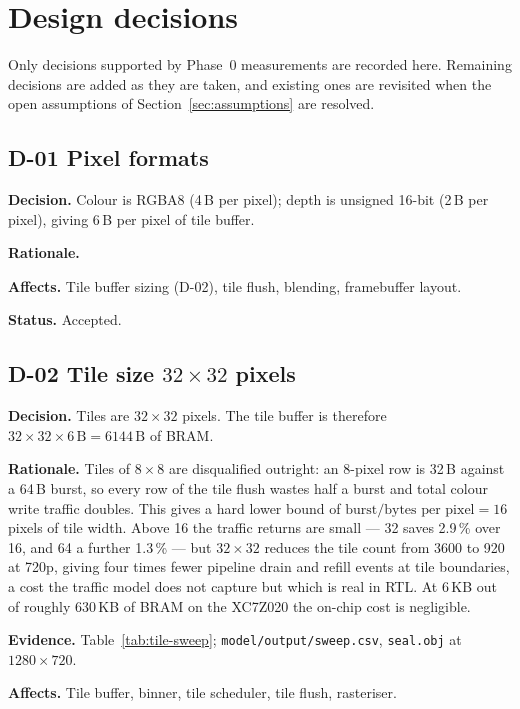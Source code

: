 \documentclass[11pt,a4paper]{article}
\newcommand{\field}[1]{\textbf{#1}\quad}
\begin{document}

\section{Design decisions}
\label{sec:decisions}

Only decisions supported by Phase~0 measurements are recorded here. Remaining
decisions are added as they are taken, and existing ones are revisited when the
open assumptions of Section~\ref{sec:assumptions} are resolved.

\subsection{D-01 \quad Pixel formats}
\field{Decision.} Colour is RGBA8 (4\,B per pixel); depth is unsigned 16-bit
(2\,B per pixel), giving 6\,B per pixel of tile buffer.

\field{Rationale.} %

\field{Affects.} Tile buffer sizing (D-02), tile flush, blending, framebuffer
layout.

\field{Status.} Accepted.

\subsection{D-02 \quad Tile size $32\times32$ pixels}
\field{Decision.} Tiles are $32\times32$ pixels. The tile buffer is therefore
$32\times32\times6\,\mathrm{B}=6144\,\mathrm{B}$ of BRAM.

\field{Rationale.} Tiles of $8\times8$ are disqualified outright: an 8-pixel row
is 32\,B against a 64\,B burst, so every row of the tile flush wastes half a
burst and total colour write traffic doubles. This gives a hard lower bound of
$\text{burst}/\text{bytes per pixel}=16$ pixels of tile width. Above 16 the
traffic returns are small --- 32 saves 2.9\,\% over 16, and 64 a further
1.3\,\% --- but $32\times32$ reduces the tile count from 3600 to 920 at 720p,
giving four times fewer pipeline drain and refill events at tile boundaries, a
cost the traffic model does not capture but which is real in RTL. At 6\,KB out
of roughly 630\,KB of BRAM on the XC7Z020 the on-chip cost is negligible.

\field{Evidence.} Table~\ref{tab:tile-sweep}; \texttt{model/output/sweep.csv},
\texttt{seal.obj} at $1280\times720$.

\field{Affects.} Tile buffer, binner, tile scheduler, tile flush, rasteriser.
\end{document}
